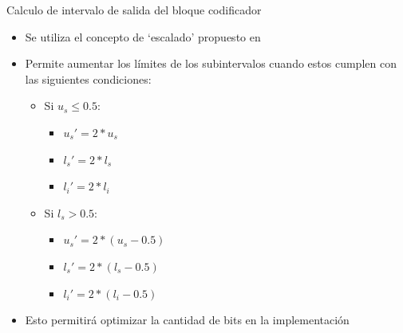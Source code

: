 \documentclass[xcolor=table]{beamer}
\begin{document}
\begin{frame}{Calculo de intervalo de salida del bloque codificador}
\begin{itemize}
    \item Se utiliza el concepto de `escalado' propuesto en \cite[Sec.\ 4] {schulte}
    \item Permite aumentar los límites de los subintervalos cuando estos cumplen con las siguientes condiciones:
\begin{itemize}
    \item Si $u_s \leq 0.5$:
        \begin{itemize}
            \item $u_s' = 2 * u_s$
            \item $l_s' = 2 * l_s$
            \item $l_i' = 2 * l_i$
        \end{itemize}
    \item Si $l_s > 0.5$: 
        \begin{itemize}
            \item $u_s' = 2 * (u_s - 0.5)$
            \item $l_s' = 2 * (l_s - 0.5)$
            \item $l_i' = 2 * (l_i - 0.5)$
        \end{itemize}
    \end{itemize}
    \item Esto permitirá optimizar la cantidad de bits en la implementación
\end{itemize}
\end{frame}

\end{document}
